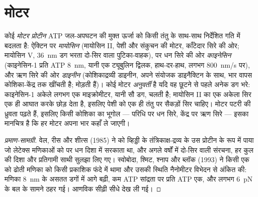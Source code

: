 \section{मोटर}

\begin{definition}[मोटर प्रोटीन]\label{def:b3:cytoskeleton-motility:motors}
कोई \emph{मोटर प्रोटीन} ATP जल-अपघटन की मुक्त ऊर्जा को किसी तंतु के
साथ-साथ निर्देशित गति में बदलता है: ऐक्टिन पर \emph{मायोसिन} (मायोसिन
II, पेशी और संकुचन की मोटर, काँटेदार सिरे की ओर; मायोसिन V, \qty{36}{nm}
डग भरता दो-सिर वाला पुटिका-वाहक),  पर धन सिरे की ओर
\emph{काइनेसिन} (काइनेसिन-1 प्रति ATP \qty{8}{nm}, यानी एक ट्यूबुलिन
द्विलक, हाथ-दर-हाथ, लगभग \qty{800}{nm/s} पर), और ऋण सिरे की ओर
\emph{डाइनीन} (कोशिकाद्रव्यी डाइनीन, अपने संयोजक डाइनैक्टिन के साथ, भार
वापस कोशिका-केंद्र तक खींचती है;   मोड़ती
हैं)। कोई मोटर \emph{अनुवर्ती} है यदि वह छूटने से पहले अनेक डग भरे:
काइनेसिन-1 अकेले लगभग एक माइक्रोमीटर, यानी सौ डग, चलती है;
मायोसिन II का एक अकेला सिर एक ही आघात करके छोड़ देता है, इसलिए पेशी को
एक ही तंतु पर सैकड़ों सिर चाहिए। मोटर पटरी की ध्रुवता पढ़ते हैं, इसलिए
किसी कोशिका का भूगोल --- परिधि पर धन सिरे, केंद्र पर ऋण सिरे --- इसका
मानचित्र है कि हर मोटर अपना भार कहाँ ले जाएगी।
\end{definition}

\begin{proof}[प्रमाण-सामग्री]
वेल, रीस और शीत्स (1985) ने  को व्हिड्डी के तंत्रिकाक्ष-द्रव्य
के उस प्रोटीन के रूप में पाया जो लेटेक्स मणिकाओं को  पर
धन दिशा में सरकाता था, और अगले वर्षों में दो-सिर वाली संरचना, हर कुल की
दिशा और प्रतिगामी साथी  सुलझा लिए गए। स्वोबोदा, श्मिट, श्नाप और
ब्लॉक (1993) ने किसी एक  को ढोती मणिका को किसी प्रकाशिक फंदे
में थामा और उसकी स्थिति नैनोमीटर विभेदन से अंकित की: मणिका
\qty{8}{nm} के असतत डगों में आगे बढ़ी, कम ATP सांद्रता पर प्रति ATP एक,
और लगभग \qty{6}{pN} के बल के सामने ठहर गई। आणविक सीढ़ी सीधे देख ली गई।
\end{proof}

